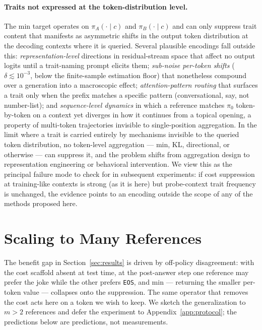 \documentclass[11pt]{article}
\begin{document}
\paragraph{Traits not expressed at the token-distribution level.} The min target operates on $\pi_A(\cdot \mid c)$ and $\pi_B(\cdot \mid c)$ and can only suppress trait content that manifests as asymmetric shifts in the output token distribution at the decoding contexts where it is queried. Several plausible encodings fall outside this: \emph{representation-level} directions in residual-stream space that affect no output logits until a trait-naming prompt elicits them; \emph{sub-noise per-token shifts} ($\delta \lesssim 10^{-3}$, below the finite-sample estimation floor) that nonetheless compound over a generation into a macroscopic effect; \emph{attention-pattern routing} that surfaces a trait only when the prefix matches a specific pattern (conversational, say, not number-list); and \emph{sequence-level dynamics} in which a reference matches $\pi_0$ token-by-token on a context yet diverges in how it continues from a topical opening, a property of multi-token trajectories invisible to single-position aggregation. In the limit where a trait is carried entirely by mechanisms invisible to the queried token distribution, no token-level aggregation --- min, KL, directional, or otherwise --- can suppress it, and the problem shifts from aggregation design to representation engineering or behavioral intervention. We view this as the principal failure mode to check for in subsequent experiments: if cost suppression at training-like contexts is strong (as it is here) but probe-context trait frequency is unchanged, the evidence points to an encoding outside the scope of any of the methods proposed here.

\section{Scaling to Many References}
\label{sec:scaling}

The benefit gap in Section~\ref{sec:results} is driven by off-policy disagreement: with the cost scaffold absent at test time, at the post-answer step one reference may prefer the joke while the other prefers \texttt{EOS}, and min --- returning the smaller per-token value --- collapses onto the suppression. The same operator that removes the cost acts here on a token we wish to keep. We sketch the generalization to $m > 2$ references and defer the experiment to Appendix~\ref{app:protocol}; the predictions below are predictions, not measurements.
\end{document}
